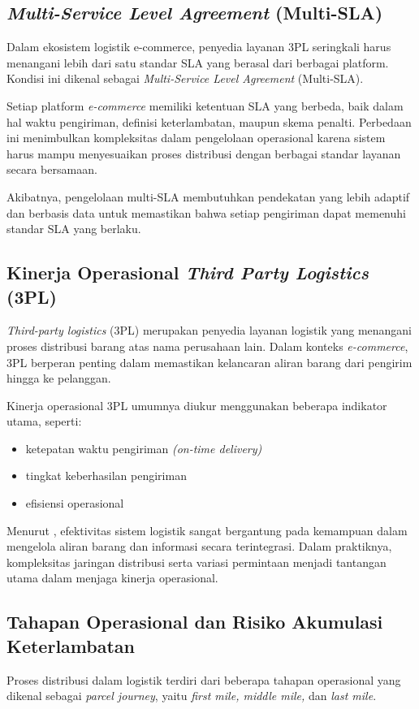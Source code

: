 \subsection{\textit{Multi-Service Level Agreement} (Multi-SLA)}
Dalam ekosistem logistik e-commerce, penyedia layanan 3PL seringkali harus menangani lebih dari satu standar SLA yang berasal dari berbagai platform. Kondisi ini dikenal sebagai \textit{Multi-Service Level Agreement }(Multi-SLA).

Setiap platform \textit{e-commerce} memiliki ketentuan SLA yang berbeda, baik dalam hal waktu pengiriman, definisi keterlambatan, maupun skema penalti. Perbedaan ini menimbulkan kompleksitas dalam pengelolaan operasional karena sistem harus mampu menyesuaikan proses distribusi dengan berbagai standar layanan secara bersamaan. 

Akibatnya, pengelolaan multi-SLA membutuhkan pendekatan yang lebih adaptif dan berbasis data untuk memastikan bahwa setiap pengiriman dapat memenuhi standar SLA yang berlaku.

\subsection{Kinerja Operasional \textit{Third Party Logistics} (3PL)}
\textit{Third-party logistics} (3PL) merupakan penyedia layanan logistik yang menangani proses distribusi barang atas nama perusahaan lain. Dalam konteks \textit{e-commerce}, 3PL berperan penting dalam memastikan kelancaran aliran barang dari pengirim hingga ke pelanggan.

Kinerja operasional 3PL umumnya diukur menggunakan beberapa indikator utama, seperti:
\begin{itemize}
    \item ketepatan waktu pengiriman \textit{(on-time delivery)}
    \item tingkat keberhasilan pengiriman
    \item efisiensi operasional
\end{itemize}

Menurut \cite{book:martin2016}, efektivitas sistem logistik sangat bergantung pada kemampuan dalam mengelola aliran barang dan informasi secara terintegrasi. Dalam praktiknya, kompleksitas jaringan distribusi serta variasi permintaan menjadi tantangan utama dalam menjaga kinerja operasional.

\subsection{Tahapan Operasional dan Risiko Akumulasi Keterlambatan}
Proses distribusi dalam logistik terdiri dari beberapa tahapan operasional yang dikenal sebagai \textit{parcel journey}, yaitu \textit{first mile, middle mile,} dan \textit{last mile}.

